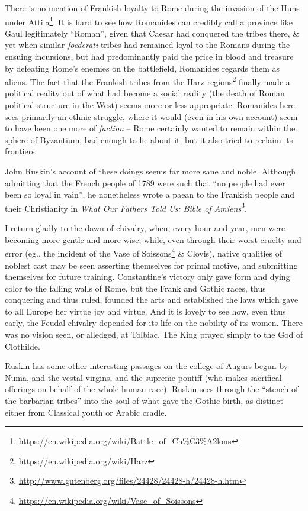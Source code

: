 There is no mention of Frankish loyalty to Rome during the invasion of the Huns under Attila\footnote{\url{https://en.wikipedia.org/wiki/Battle\_of\_Ch\%C3\%A2lons}}. It is hard to see how Romanides can credibly call a province like Gaul legitimately ``Roman'', given that Caesar had conquered the tribes there, \& yet when similar \emph{foederati} tribes had remained loyal to the Romans during the ensuing incursions, but had predominantly paid the price in blood and treasure by defeating Rome's enemies on the battlefield, Romanides regards them as aliens. The fact that the Frankish tribes from the Harz regions\footnote{\url{https://en.wikipedia.org/wiki/Harz}} finally made a political reality out of what had become a social reality (the death of Roman political structure in the West) seems more or less appropriate. Romanides here sees primarily an ethnic struggle, where it would (even in his own account) seem to have been one more of \emph{faction} -- Rome certainly wanted to remain within the sphere of Byzantium, bad enough to lie about it; but it also tried to reclaim its frontiers.

John Ruskin's account of these doings seems far more sane and noble. Although admitting that the French people of 1789 were such that ``no people had ever been so loyal in vain'', he nonetheless wrote a paean to the Frankish people and their Christianity in \emph{What Our Fathers Told Us: Bible of Amiens}\footnote{\url{http://www.gutenberg.org/files/24428/24428-h/24428-h.htm}}.

\begin{quotex}
I return gladly to the dawn of chivalry, when, every hour and year, men were becoming more gentle and more wise; while, even through their worst cruelty and error (eg., the incident of the Vase of Soissons\footnote{\url{https://en.wikipedia.org/wiki/Vase\_of\_Soissons}} \& Clovis), native qualities of noblest cast may be seen asserting themselves for primal motive, and submitting themselves for future training. Constantine's victory only gave form and dying color to the falling walls of Rome, but the Frank and Gothic races, thus conquering and thus ruled, founded the arts and established the laws which gave to all Europe her virtue joy and virtue. And it is lovely to see how, even thus early, the Feudal chivalry depended for its life on the nobility of its women. There was no vision seen, or alledged, at Tolbiac. The King prayed simply to the God of Clothilde.
\end{quotex}


Ruskin has some other interesting passages on the college of Augurs begun by Numa, and the vestal virgins, and the supreme pontiff (who makes sacrifical offerings on behalf of the whole human race). Ruskin sees through the ``stench of the barbarian tribes'' into the soul of what gave the Gothic birth, as distinct either from Classical youth or Arabic cradle.

